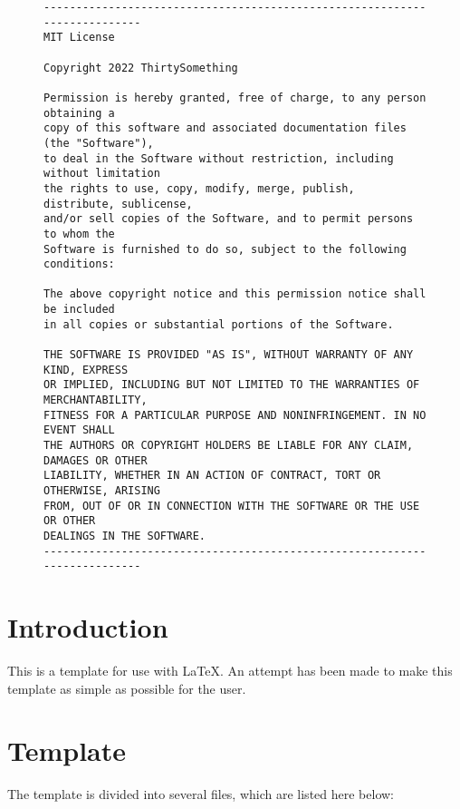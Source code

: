 \begin{figure}[H]
    \footnotesize
    \centering
    \begin{BVerbatim}
--------------------------------------------------------------------------
MIT License

Copyright 2022 ThirtySomething

Permission is hereby granted, free of charge, to any person obtaining a
copy of this software and associated documentation files (the "Software"),
to deal in the Software without restriction, including without limitation
the rights to use, copy, modify, merge, publish, distribute, sublicense,
and/or sell copies of the Software, and to permit persons to whom the
Software is furnished to do so, subject to the following conditions:

The above copyright notice and this permission notice shall be included
in all copies or substantial portions of the Software.

THE SOFTWARE IS PROVIDED "AS IS", WITHOUT WARRANTY OF ANY KIND, EXPRESS
OR IMPLIED, INCLUDING BUT NOT LIMITED TO THE WARRANTIES OF MERCHANTABILITY,
FITNESS FOR A PARTICULAR PURPOSE AND NONINFRINGEMENT. IN NO EVENT SHALL
THE AUTHORS OR COPYRIGHT HOLDERS BE LIABLE FOR ANY CLAIM, DAMAGES OR OTHER
LIABILITY, WHETHER IN AN ACTION OF CONTRACT, TORT OR OTHERWISE, ARISING
FROM, OUT OF OR IN CONNECTION WITH THE SOFTWARE OR THE USE OR OTHER
DEALINGS IN THE SOFTWARE.
--------------------------------------------------------------------------
    \end{BVerbatim}
\end{figure}

\section{Introduction}

This is a template for use with \LaTeX{}. An attempt has been made to make
this template as simple as possible for the user.

\section{Template}
\label{sec:Template}

The template is divided into several files, which are listed here below:


